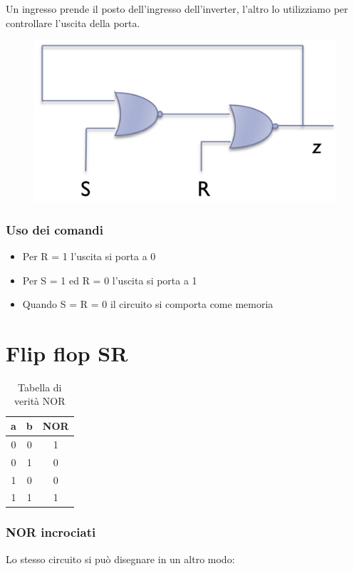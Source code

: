 Un ingresso prende il posto dell'ingresso dell'inverter, l'altro lo utilizziamo per controllare l'uscita della porta.

\begin{figure}[htbp]
    \centering
    \includegraphics[width=0.4\linewidth]{img/buffer_nor.png}
    
    
\end{figure}

\subsubsection{Uso dei comandi}

\begin{itemize}
    \item Per R = 1 l'uscita si porta a 0
    \item Per S = 1 ed R = 0 l'uscita si porta a 1
    \item Quando S = R = 0 il circuito si comporta come memoria
\end{itemize}


\section{Flip flop SR}

\begin{table}[htbp]
    \centering
    \begin{tabular}{cc|c}
        a & b & NOR\\
        \hline
        0 & 0 & 1\\
        0 & 1 & 0\\
        1 & 0 & 0\\
        1 & 1 & 1\\
    \end{tabular}
    \caption{Tabella di verità NOR}
\end{table}


\subsubsection{NOR incrociati}

Lo stesso circuito si può disegnare in un altro modo:


